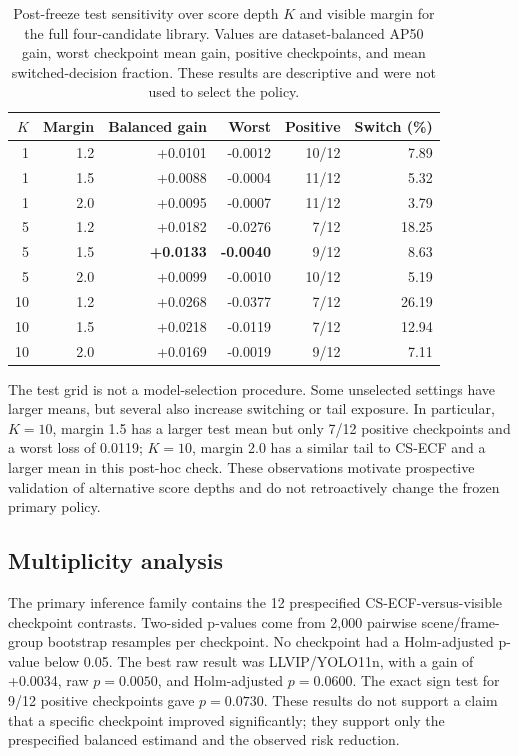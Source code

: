 \documentclass[11pt]{article}
\begin{document}
\begin{table}[ht]
\centering
\small
\caption{Post-freeze test sensitivity over score depth \(K\) and visible margin
for the full four-candidate library. Values are dataset-balanced AP50 gain,
worst checkpoint mean gain, positive checkpoints, and mean switched-decision
fraction. These results are descriptive and were not used to select the policy.}
\label{tab:test-grid}
\begin{tabular}{@{}rrrrrr@{}}
\toprule
\(K\) & Margin & Balanced gain & Worst & Positive & Switch (\%) \\
\midrule
1 & 1.2 & +0.0101 & -0.0012 & 10/12 & 7.89 \\
1 & 1.5 & +0.0088 & -0.0004 & 11/12 & 5.32 \\
1 & 2.0 & +0.0095 & -0.0007 & 11/12 & 3.79 \\
5 & 1.2 & +0.0182 & -0.0276 & 7/12 & 18.25 \\
5 & 1.5 & \textbf{+0.0133} & \textbf{-0.0040} & 9/12 & 8.63 \\
5 & 2.0 & +0.0099 & -0.0010 & 10/12 & 5.19 \\
10 & 1.2 & +0.0268 & -0.0377 & 7/12 & 26.19 \\
10 & 1.5 & +0.0218 & -0.0119 & 7/12 & 12.94 \\
10 & 2.0 & +0.0169 & -0.0019 & 9/12 & 7.11 \\
\bottomrule
\end{tabular}
\end{table}

The test grid is not a model-selection procedure. Some unselected settings
have larger means, but several also increase switching or tail exposure. In
particular, \(K=10\), margin 1.5 has a larger test mean but only 7/12 positive
checkpoints and a worst loss of 0.0119; \(K=10\), margin 2.0 has a similar
tail to CS-ECF and a larger mean in this post-hoc check. These observations
motivate prospective validation of alternative score depths and do not
retroactively change the frozen primary policy.

\subsection{Multiplicity analysis}

The primary inference family contains the 12 prespecified
CS-ECF-versus-visible checkpoint contrasts. Two-sided p-values come from 2,000
pairwise scene/frame-group bootstrap resamples per checkpoint. No checkpoint
had a Holm-adjusted p-value below 0.05. The best raw result was
LLVIP/YOLO11n, with a gain of +0.0034, raw \(p=0.0050\), and Holm-adjusted
\(p=0.0600\). The exact sign test for 9/12 positive checkpoints gave
\(p=0.0730\). These results do not support a claim that a specific checkpoint
improved significantly; they support only the prespecified balanced estimand
and the observed risk reduction.
\end{document}

